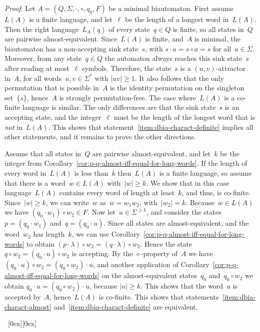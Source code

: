 \documentclass[submission]{eptcs}
\newcommand{\abs}[1]{\left\lvert{#1}\right\rvert}
\newcommand*{\qed}{\raisebox{0.5ex}[0ex][0ex]{\framebox[1ex][l]{}}}
\newenvironment{proof}{\par\noindent
  {\rmfamily\itshape\mdseries Proof\/}:\hspace{\labelsep}\ignorespaces}{\mbox{}\nolinebreak\hfill~{\qed}
  \medbreak
}
\begin{document}
\begin{proof}
  Let $A=(Q,\Sigma,\cdot,\circ,q_0,F)$ be a minimal biautomaton.
  First assume~$L(A)$ is a finite language, and let~$\ell$ be the
  length of a longest word in~$L(A)$.  Then the right
  language~$L_A(q)$ of every state~$q\in Q$ is finite, so all states
  in~$Q$ are pairwise almost-equivalent.  Since~$L(A)$ is finite,
  and~$A$ is minimal, the biautomaton has a non-accepting sink
  state~$s$, with $s\cdot a = s\circ a = s$ for all~$a\in\Sigma$.
  Moreover, from any state~$q\in Q$ the automaton always reaches this
  sink state~$s$ after reading at most~$\ell$ symbols.  Therefore, the
  state~$s$ is a $(u,v)$-attractor in~$A$, for all
  words~$u,v\in\Sigma^*$ with $|uv|\geq 1$.  It also follows that the
  only permutation that is possible in~$A$ is the identity permutation
  on the singleton set~$\{s\}$, hence~$A$ is strongly
  permutation-free.  The case where~$L(A)$ is a co-finite language is
  similar.  The only differences are that the sink state~$s$ is an
  accepting state, and the integer~$\ell$ must be the length of the
  longest word that is \emph{not} in~$L(A)$.  This shows that
  statement~\ref{item:dbia-charact-definite} implies all other
  statements, and it remains to prove the other directions.

  Assume that all states in~$Q$ are pairwise almost-equivalent, and
  let~$k$ be the integer from
  Corollary~\ref{cor:p-q-almost-iff-equal-for-long-words}.  If the
  length of every word in~$L(A)$ is less than~$k$ then~$L(A)$ is a
  finite language, so assume that there is a word~$w\in L(A)$
  with~$\abs w \geq k$.  We show that in this case language~$L(A)$
  contains every word of length at least~$k$, and thus, is co-finite.
  Since~$\abs w \geq k$, we can write~$w$ as~$w=w_1w_2$,
  with~$\abs{w_2}=k$.  Because~$w\in L(A)$ we have $(q_0\cdot
  w_1)\circ w_2\in F$.  Now let~$u\in\Sigma^{\geq k}$, and consider
  the states~$p=(q_0\cdot w_1)$ and~$q=(q_0\cdot u)$.  Since all
  states are almost-equivalent, and the word~$w_2$ has length~$k$, we
  can use Corollary~\ref{cor:p-q-almost-iff-equal-for-long-words} to
  obtain $(p\cdot \lambda)\circ w_2 = (q\cdot \lambda)\circ w_2$.
  Hence the state $q\circ w_2 = (q_0\cdot u)\circ w_2$ is accepting.
  By the $\diamond$-property of~$A$ we have $(q_0\cdot u)\circ w_2 =
  (q_0\circ w_2)\cdot u$, and another application of
  Corollary~\ref{cor:p-q-almost-iff-equal-for-long-words} on the
  almost-equivalent states~$q_0$ and~$q_0\circ w_2$ we obtain
  $q_0\cdot u = (q_0\circ w_2)\cdot u$, because $\abs u \geq k$.  This
  shows that the word~$u$ is accepted by~$A$, hence~$L(A)$ is
  co-finite.  This shows that
  statements~\ref{item:dbia-charact-almost}
  and~\ref{item:dbia-charact-definite} are equivalent.
  

\end{proof}
\end{document}
